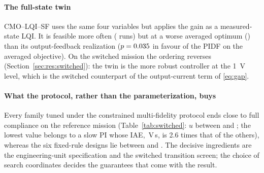 \paragraph{The full-state twin} CMO--LQI--SF uses the same four variables but
applies the gain as a measured-state LQI. It is feasible more often
(\FeasSF{} runs) but at a worse averaged optimum (\BestSF) than its
output-feedback realization ($p=0.035$ in favour of the PIDF on the averaged
objective). On the switched mission the ordering reverses
(Section~\ref{sec:res:switched}): the twin is the more robust controller at the
\SI{1}{V} level, which is the switched counterpart of the output-current term
of \eqref{eq:gap}.

\paragraph{What the protocol, rather than the parameterization, buys}
Every family tuned under the constrained multi-fidelity protocol ends close to
full compliance on the reference mission (Table~\ref{tab:switched}: $u$ between
\SwPIdUtil{} and \SwUtil{}; the lowest value belongs to a slow PI whose IAE,
\SwPIdIAE{}\,V\,s, is 2.6 times that of the others), whereas the six fixed-rule designs lie between
\SwLQIUtil{} and \SwLQRUtil{}. The decisive ingredients are the
engineering-unit specification and the switched transition screen; the choice
of search coordinates decides the guarantees that come with the result.
